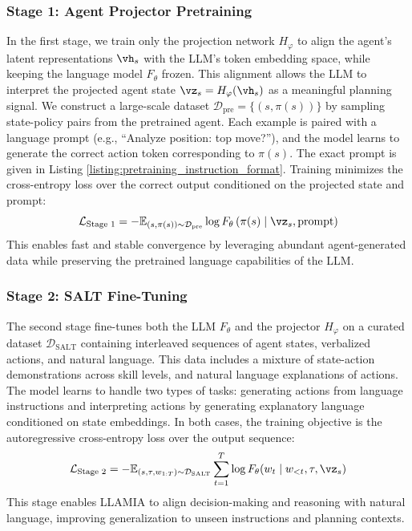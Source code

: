 \documentclass{article}
\theoremstyle{plain}
\theoremstyle{definition}
\theoremstyle{remark}
\begin{document}
\subsubsection{Stage 1: Agent Projector Pretraining}

In the first stage, we train only the projection network \(H_\varphi\) to align the agent’s latent representations \(\vh_s\) with the LLM’s token embedding space, while keeping the language model \(F_\theta\) frozen. This alignment allows the LLM to interpret the projected agent state \(\vz_s = H_\varphi(\vh_s)\) as a meaningful planning signal. We construct a large-scale dataset \(\mathcal{D}_{\text{pre}} = \{(s, \pi(s))\}\) by sampling state-policy pairs from the pretrained agent. Each example is paired with a language prompt (e.g., ``Analyze position: top move?''), and the model learns to generate the correct action token corresponding to \(\pi(s)\). The exact prompt is given in Listing \ref{listing:pretraining_instruction_format}. Training minimizes the cross-entropy loss over the correct output conditioned on the projected state and prompt:
\[
\mathcal{L}_{\text{Stage 1}} = -\mathbb{E}_{(s, \pi(s)) \sim \mathcal{D}_{\text{pre}}} \log F_\theta\left( \pi(s) \mid \vz_s, \text{prompt} \right)
\]
This enables fast and stable convergence by leveraging abundant agent-generated data while preserving the pretrained language capabilities of the LLM.

\subsubsection{Stage 2: SALT Fine-Tuning}

The second stage fine-tunes both the LLM \(F_\theta\) and the projector \(H_\varphi\) on a curated dataset \(\mathcal{D}_{\text{SALT}}\) containing interleaved sequences of agent states, verbalized actions, and natural language. This data includes a mixture of state-action demonstrations across skill levels, and natural language explanations of actions. The model learns to handle two types of tasks: generating actions from language instructions and interpreting actions by generating explanatory language conditioned on state embeddings. In both cases, the training objective is the autoregressive cross-entropy loss over the output sequence:
\[
\mathcal{L}_{\text{Stage 2}} = -\mathbb{E}_{(s, \tau, w_{1:T}) \sim \mathcal{D}_{\text{SALT}}} \sum_{t=1}^T \log F_\theta(w_t \mid w_{<t}, \tau, \vz_s)
\]
This stage enables LLAMIA to align decision-making and reasoning with natural language, improving generalization to unseen instructions and planning contexts.
\end{document}
